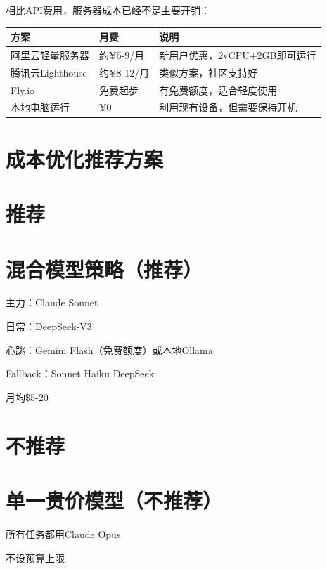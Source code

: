 \documentclass[
  10
]{article}
\newcounter{none} %
\begin{document}
相比API费用，服务器成本已经不是主要开销：

{\def\LTcaptype{none} %
\begin{longtable}[]{@{}|l|l|l|@{}}
\toprule\noalign{}
\endhead
\bottomrule\noalign{}
\endlastfoot
\hline
方案 & 月费 & 说明 \\
\hline
阿里云轻量服务器 & 约¥6-9/月 & 新用户优惠，2vCPU+2GB即可运行 \\
\hline
腾讯云Lighthouse & 约¥8-12/月 & 类似方案，社区支持好 \\
\hline
Fly.io & 免费起步 & 有免费额度，适合轻度使用 \\
\hline
本地电脑运行 & ¥0 & 利用现有设备，但需要保持开机 \\
\hline
\end{longtable}
}

\section{成本优化推荐方案}\label{ux6210ux672cux4f18ux5316ux63a8ux8350ux65b9ux6848}

\section{推荐}\label{ux63a8ux8350}

\section{混合模型策略（推荐）}\label{ux6df7ux5408ux6a21ux578bux7b56ux7565ux63a8ux8350}

主力：Claude Sonnet

日常：DeepSeek-V3

心跳：Gemini Flash（免费额度）或本地Ollama

Fallback：Sonnet Haiku DeepSeek

月均\$5-20

\section{不推荐}\label{ux4e0dux63a8ux8350}

\section{单一贵价模型（不推荐）}\label{ux5355ux4e00ux8d35ux4ef7ux6a21ux578bux4e0dux63a8ux8350}

所有任务都用Claude Opus

不设预算上限
\end{document}
